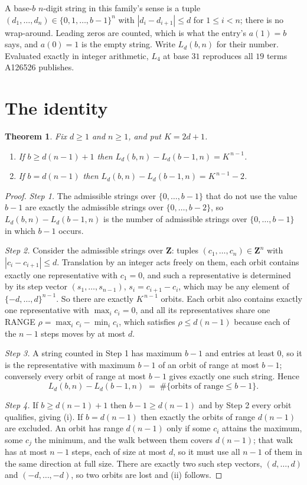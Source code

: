 \documentclass[11pt,a4paper]{article}
\theoremstyle{plain}
\newtheorem{theorem}{Theorem}
\theoremstyle{definition}
\begin{document}
A base-$b$ $n$-digit string in this family's sense is a tuple
$(d_1,\dots,d_n)\in\{0,1,\dots,b-1\}^{n}$ with $|d_i-d_{i+1}|\le d$ for $1\le i<n$; there
is no wrap-around. Leading zeros are counted, which is what the entry's $a(1)=b$ says, and
$a(0)=1$ is the empty string. Write $L_d(b,n)$ for their number. Evaluated exactly in integer
arithmetic, $L_{4}$ at base $31$ reproduces all $19$ terms A126526 publishes.

\section{The identity}

\begin{theorem}
Fix $d\ge1$ and $n\ge1$, and put $K=2d+1$.
\begin{enumerate}
\item[(i)] If $b\ge d(n-1)+1$ then $L_d(b,n)-L_d(b-1,n)=K^{\,n-1}$.
\item[(ii)] If $b=d(n-1)$ then $L_d(b,n)-L_d(b-1,n)=K^{\,n-1}-2$.
\end{enumerate}
\end{theorem}

\begin{proof}
\emph{Step 1.} The admissible strings over $\{0,\dots,b-1\}$ that do not use the value $b-1$
are exactly the admissible strings over $\{0,\dots,b-2\}$, so $L_d(b,n)-L_d(b-1,n)$ is the
number of admissible strings over $\{0,\dots,b-1\}$ in which $b-1$ occurs.

\emph{Step 2.} Consider the admissible strings over $\mathbf{Z}$: tuples
$(c_1,\dots,c_n)\in\mathbf{Z}^{n}$ with $|c_i-c_{i+1}|\le d$. Translation by an integer acts
freely on them, each orbit contains exactly one representative with $c_1=0$, and such a
representative is determined by its step vector $(s_1,\dots,s_{n-1})$, $s_i=c_{i+1}-c_i$,
which may be any element of $\{-d,\dots,d\}^{n-1}$. So there are exactly $K^{\,n-1}$ orbits.
Each orbit also contains exactly one representative with $\max_i c_i=0$, and all its
representatives share one RANGE $\rho=\max_ic_i-\min_ic_i$, which satisfies
$\rho\le d(n-1)$ because each of the $n-1$ steps moves by at most $d$.

\emph{Step 3.} A string counted in Step 1 has maximum $b-1$ and entries at least $0$, so it is
the representative with maximum $b-1$ of an orbit of range at most $b-1$; conversely every orbit
of range at most $b-1$ gives exactly one such string. Hence
\[
L_d(b,n)-L_d(b-1,n)\;=\;\#\{\text{orbits of range}\le b-1\} .
\]

\emph{Step 4.} If $b\ge d(n-1)+1$ then $b-1\ge d(n-1)$ and by Step 2 every orbit qualifies,
giving (i). If $b=d(n-1)$ then exactly the orbits of range $d(n-1)$ are excluded. An orbit has
range $d(n-1)$ only if some $c_i$ attains the maximum, some $c_j$ the minimum, and the walk
between them covers $d(n-1)$; that walk has at most $n-1$ steps, each of size at most $d$, so it
must use all $n-1$ of them in the same direction at full size. There are exactly two such step
vectors, $(d,\dots,d)$ and $(-d,\dots,-d)$, so two orbits are lost and (ii) follows.
\end{proof}
\end{document}
